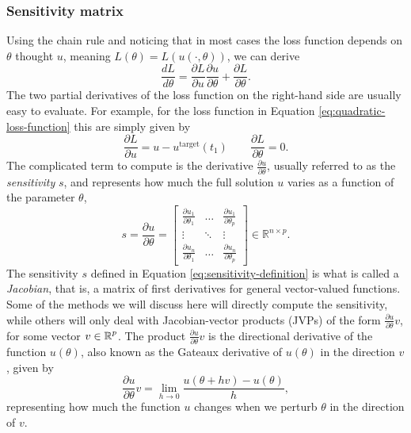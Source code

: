 \subsubsection{Sensitivity matrix}

Using the chain rule and noticing that in most cases the loss function depends on $\theta$ thought $u$, meaning $L(\theta) = L(u(\cdot, \theta))$, we can derive
\begin{equation} 
 \frac{dL}{d\theta} = \frac{\partial L}{\partial u} \frac{\partial u}{\partial \theta} + \frac{\partial L}{\partial \theta}.
 \label{eq:dLdtheta_VJP}
\end{equation} 
The two partial derivatives of the loss function on the right-hand side are usually easy to evaluate.
For example, for the loss function in Equation \eqref{eq:quadratic-loss-function} this are simply given by 
\begin{equation}
    \frac{\partial L}{\partial u} = u - u^{\text{target}}(t_1)
    \qquad 
    \frac{\partial L}{\partial \theta} = 0.
    \label{eq:dLdu}
\end{equation}
The complicated term to compute is the derivative $\frac{\partial u}{\partial \theta}$, usually referred to as the \textit{sensitivity} $s$, and represents how much the full solution $u$ varies as a function of the parameter $\theta$, 
\begin{equation}
 s 
 = 
 \frac{\partial u}{\partial \theta} 
 =
 \begin{bmatrix}
   \frac{\partial u_1}{\partial \theta_1} & \dots & \frac{\partial u_1}{\partial \theta_p} \\
   \vdots & \ddots & \vdots \\
   \frac{\partial u_n}{\partial \theta_1} & \dots & \frac{\partial u_n}{\partial \theta_p}
 \end{bmatrix}
 \in \mathbb R^{n \times p}.
 \label{eq:sensitivity-definition}
\end{equation}
The sensitivity $s$ defined in Equation \eqref{eq:sensitivity-definition} is what is called a \textit{Jacobian}, that is, a matrix of first derivatives for general vector-valued functions.
Some of the methods we will discuss here will directly compute the sensitivity, while others will only deal with Jacobian-vector products (JVPs) of the form $\frac{\partial u}{\partial \theta} v$, for some vector $v \in \operatorname{\mathbb{R}}^p$. 
The product $\frac{\partial u}{\partial \theta}v$ is the directional derivative of the function $u(\theta)$, also known as the Gateaux derivative of $u(\theta)$ in the direction $v$, given by 
\begin{equation}
    \frac{\partial u}{\partial \theta} v 
    = 
    \lim_{h \rightarrow 0} \frac{u(\theta + h v) - u(\theta)}{h},
    \label{eq:directional-derivative}
\end{equation}
representing how much the function $u$ changes when we perturb $\theta$ in the direction of $v$. 

